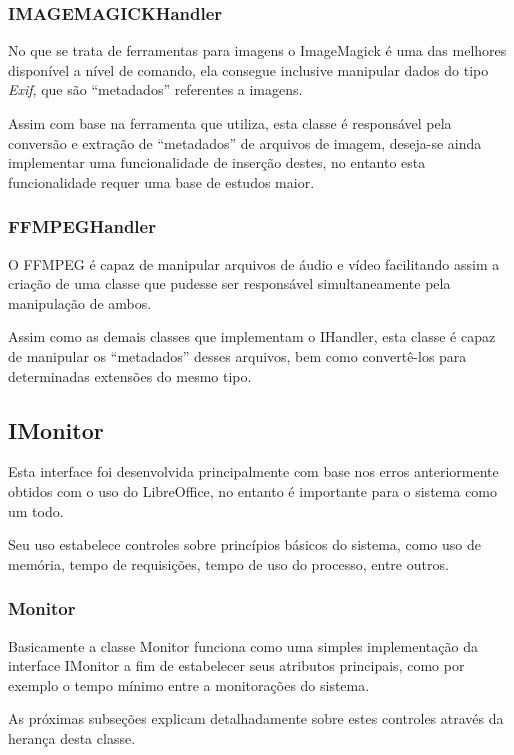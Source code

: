 \subsubsection{IMAGEMAGICKHandler}

No que se trata de ferramentas para imagens o ImageMagick é uma das melhores disponível a nível de comando, ela consegue inclusive manipular dados do tipo \textit{Exif}, que são ``metadados'' referentes a imagens.

Assim com base na ferramenta que utiliza, esta classe é responsável pela conversão e extração de ``metadados'' de arquivos de imagem, deseja-se ainda implementar uma funcionalidade de inserção destes, no entanto esta funcionalidade requer uma base de estudos maior.


\subsubsection{FFMPEGHandler}

O FFMPEG  é capaz de manipular arquivos de áudio e vídeo facilitando assim a criação de uma classe que pudesse ser responsável simultaneamente pela manipulação de ambos.

Assim como as demais classes que implementam o IHandler, esta classe é capaz de manipular os ``metadados'' desses arquivos, bem como convertê-los para determinadas extensões do mesmo tipo.


\subsection{IMonitor}

Esta interface foi desenvolvida principalmente com base nos erros anteriormente obtidos com o uso do LibreOffice, no entanto é importante para o sistema como um todo.

Seu uso estabelece controles sobre princípios básicos do sistema, como uso de memória, tempo de requisições, tempo de uso do processo, entre outros.


\subsubsection{Monitor}

Basicamente a classe Monitor funciona como uma simples implementação da interface IMonitor a fim de estabelecer seus atributos principais, como por exemplo o tempo mínimo entre a monitorações do sistema. 

As próximas subseções explicam detalhadamente sobre estes controles através da herança desta classe.


